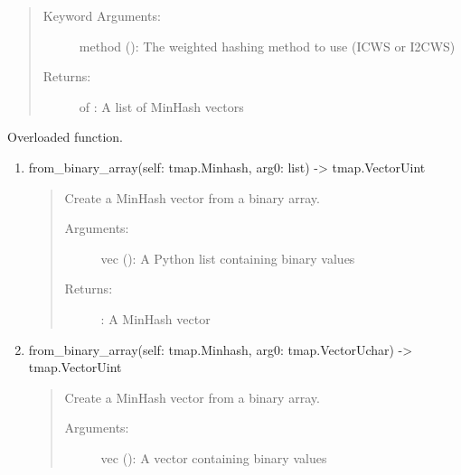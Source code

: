 \documentclass[letterpaper,10pt,english]{sphinxmanual}
\begin{document}
\begin{fulllineitems}
\begin{fulllineitems}
\begin{enumerate}
\begin{quote}
\begin{description}
\item[{Keyword Arguments:}] \leavevmode
method (): The weighted hashing method to use (ICWS or I2CWS)

\item[{Returns:}] \leavevmode
{} of : A list of MinHash vectors

\end{description}
\end{quote}

\end{enumerate}

\end{fulllineitems}


\begin{fulllineitems}
\label{\detokenize{documentation:tmap.Minhash.from_binary_array}}
Overloaded function.
\begin{enumerate}
\def\theenumi{\arabic{enumi}}
\def\labelenumi{\theenumi .}
\makeatletter\def\p@enumii{\p@enumi \theenumi .}\makeatother
\item {} 
from\_binary\_array(self: tmap.Minhash, arg0: list) -\textgreater{} tmap.VectorUint
\begin{quote}

Create a MinHash vector from a binary array.
\begin{description}
\item[{Arguments:}] \leavevmode
vec (): A Python list containing binary values

\item[{Returns:}] \leavevmode
{}: A MinHash vector

\end{description}
\end{quote}

\item {} 
from\_binary\_array(self: tmap.Minhash, arg0: tmap.VectorUchar) -\textgreater{} tmap.VectorUint
\begin{quote}

Create a MinHash vector from a binary array.
\begin{description}
\item[{Arguments:}] \leavevmode
vec (): A vector containing binary values


\end{description}
\end{quote}
\end{enumerate}
\end{fulllineitems}
\end{fulllineitems}
\end{document}
